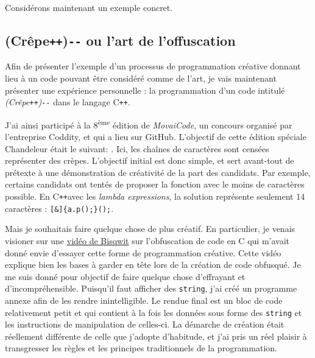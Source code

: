 \documentclass[12pt]{article} %
\newcommand{\ts}{\textsuperscript} %
\newcommand{\p}{\texttt{+}} %
\newcommand{\doublep}{\texttt{++}} %
\newcommand{\doublem}{\texttt{-}\texttt{-} \space} %
\begin{document}
Considérons maintenant un exemple concret. %



\subsection{(Crêpe\doublep)\doublem ou l'art de l'offuscation}
Afin de présenter l'exemple d'un processus de programmation créative donnant lieu à un code pouvant être considéré comme de l'art, je vais maintenant présenter une expérience personnelle : la programmation d'un code intitulé \textit{(Crêpe\doublep)\doublem} dans le langage C\p\p. 

J'ai ainsi participé à la 8\ts{ème} édition de \textit{MovaiCode}, un concours organisé par l'entreprise Coddity, et qui a lieu sur GitHub. L'objectif de cette édition spéciale Chandeleur était le suivant:  \cite{movaicode-enonce8}. Ici, les chaînes de caractères sont censées représenter des crèpes. L'objectif initial est donc simple, et sert avant-tout de prétexte à une démonstration de créativité de la part des candidats. Par exemple, certains candidats ont tentés de proposer la fonction avec le moins de caractères possible. En C\p\p \space avec les \textit{lambda expressions}, la solution représente seulement 14 caractères : \verb|[&]{a.p();}();|.

Mais je souhaitais faire quelque chose de plus créatif. En particulier, je venais visioner sur une \href{https://youtu.be/rwOI1biZeD8}{vidéo de Bisqwit} sur l'obfuscation de code en C \cite{Bisqwit-obfuscatedCCode} qui m'avait donné envie d'essayer cette forme de programmation créative. Cette vidéo explique bien les bases à garder en tête lors de la création de code obfusqué. Je me suis donné pour objectif de faire quelque chose d'effrayant et d'incompréhensible. Puisqu'il faut afficher des \verb|string|, j'ai créé un programme annexe afin de les rendre inintelligible. Le rendue final est un bloc de code relativement petit et qui contient à la fois les données sous forme des \verb|string| et les instructions de manipulation de celles-ci. La démarche de création était réellement différente de celle que j'adopte d'habitude, et j'ai pris un réel plaisir à transgresser les règles et les principes traditionnels de la programmation.
\end{document}

